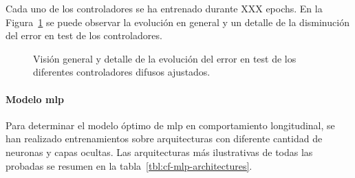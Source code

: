 Cada uno de los controladores se ha entrenado durante XXX epochs. En la Figura~\ref{fig:adjusted-fcs} se puede observar la evolución en general y un detalle de la disminución del error en test de los controladores.

\begin{figure}
	\centering
	\qquad
	\caption[Evolución del error en test de los controladores difusos ajustados]{Visión general y detalle de la evolución del error en test de los diferentes controladores difusos ajustados.}
	\label{fig:adjusted-fcs}
\end{figure}



\paragraph{Modelo \ac{mlp}}

Para determinar el modelo óptimo de \ac{mlp} en comportamiento longitudinal, se han realizado entrenamientos sobre arquitecturas con diferente cantidad de neuronas y capas ocultas. Las arquitecturas más ilustrativas de todas las probadas se resumen en la tabla~\ref{tbl:cf-mlp-architectures}.


